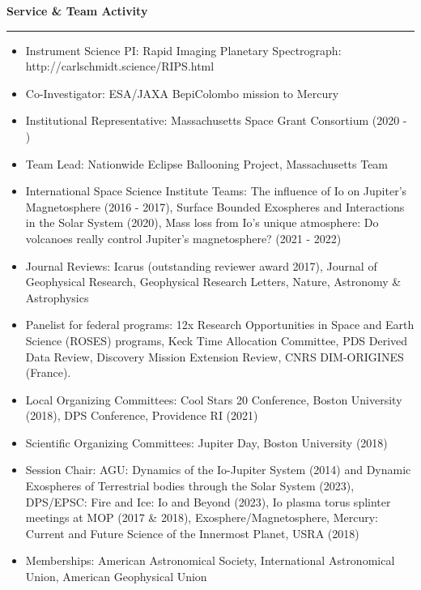 \documentclass[12pt]{report}
\begin{document}
\noindent\bf{Service \& Team Activity}\rm \hspace*{\fill} \\
\rule{\textwidth}{1pt}
\begin{itemize} \itemsep -2pt %
  \item Instrument Science PI: Rapid Imaging Planetary Spectrograph: http://carlschmidt.science/RIPS.html
  \item Co-Investigator: ESA/JAXA BepiColombo mission to Mercury
  \item Institutional Representative: Massachusetts Space Grant Consortium (2020 - )
  \item Team Lead: Nationwide Eclipse Ballooning Project, Massachusetts Team
  \item International Space Science Institute Teams: The influence of Io on Jupiter's Magnetosphere (2016 - 2017), Surface Bounded Exospheres and Interactions in the Solar System (2020), Mass loss from Io’s unique atmosphere: Do volcanoes really control Jupiter’s magnetosphere? (2021 - 2022)
  \item Journal Reviews: Icarus (outstanding reviewer award 2017), Journal of Geophysical Research, Geophysical Research Letters, Nature, Astronomy \& Astrophysics
  \item Panelist for federal programs: 12x Research Opportunities in Space and Earth Science (ROSES) programs, Keck Time Allocation Committee, PDS Derived Data Review, Discovery Mission Extension Review,  CNRS DIM-ORIGINES (France).
  \item Local Organizing Committees: Cool Stars 20 Conference, Boston University (2018), DPS Conference, Providence RI (2021)
  \item Scientific Organizing Committees: Jupiter Day, Boston University (2018)
  \item Session Chair: AGU: Dynamics of the Io-Jupiter System (2014) and Dynamic Exospheres of Terrestrial bodies through the Solar System (2023), DPS/EPSC: Fire and Ice: Io and Beyond (2023), Io plasma torus splinter meetings at MOP (2017 \& 2018), Exosphere/Magnetosphere, Mercury: Current and Future Science of the Innermost Planet, USRA (2018)
  \item Memberships: American Astronomical Society, International Astronomical Union, American Geophysical Union
\end{itemize}
\vspace{2 mm}
\end{document}
